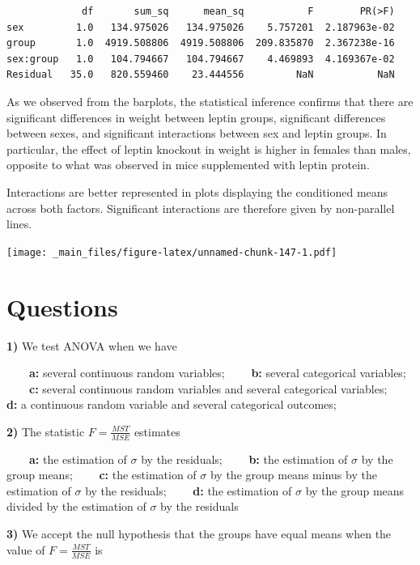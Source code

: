\documentclass[
]{book}
\begin{document}
\begin{verbatim}
             df       sum_sq      mean_sq           F        PR(>F)
sex         1.0   134.975026   134.975026    5.757201  2.187963e-02
group       1.0  4919.508806  4919.508806  209.835870  2.367238e-16
sex:group   1.0   104.794667   104.794667    4.469893  4.169367e-02
Residual   35.0   820.559460    23.444556         NaN           NaN
\end{verbatim}

As we observed from the barplots, the statistical inference confirms that there are significant differences in weight between leptin groups, significant differences between sexes, and significant interactions between sex and leptin groups. In particular, the effect of leptin knockout in weight is higher in females than males, opposite to what was observed in mice supplemented with leptin protein.

Interactions are better represented in plots displaying the conditioned means across both factors. Significant interactions are therefore given by non-parallel lines.

\texttt{[image: \_main\_files/figure-latex/unnamed-chunk-147-1.pdf]}

\hypertarget{questions-13}{%
\section{Questions}\label{questions-13}}

\textbf{1)} We test ANOVA when we have

\textbf{\(\qquad\)a:} several continuous random variables;
\textbf{\(\qquad\)b:} several categorical variables;
\textbf{\(\qquad\)c:} several continuous random variables and several categorical variables;
\textbf{\(\qquad\)d:} a continuous random variable and several categorical outcomes;

\textbf{2)} The statistic \(F=\frac{MST}{MSE}\) estimates

\textbf{\(\qquad\)a:} the estimation of \(\sigma\) by the residuals;
\textbf{\(\qquad\)b:} the estimation of \(\sigma\) by the group means;
\textbf{\(\qquad\)c:} the estimation of \(\sigma\) by the group means minus by the estimation of \(\sigma\) by the residuals;
\textbf{\(\qquad\)d:} the estimation of \(\sigma\) by the group means divided by the estimation of \(\sigma\) by the residuals

\textbf{3)} We accept the null hypothesis that the groups have equal means when the value of \(F=\frac{MST}{MSE}\) is
\end{document}
